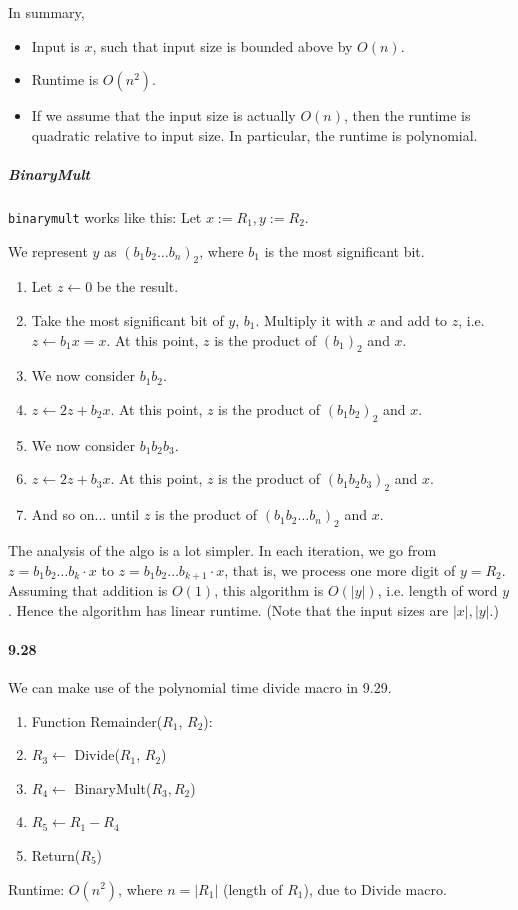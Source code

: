 \documentclass{article}
\begin{document}
In summary,
\begin{itemize}
	\item Input is $x$, such that input size is bounded above by $O(n)$.
	\item Runtime is $O(n^2)$.
	\item If we assume that the input size is actually $O(n)$, then the runtime is quadratic relative to input size. In particular, the runtime is polynomial.
\end{itemize}

\subparagraph{BinaryMult} \texttt{binarymult} works like this: Let $x:=R_1, y:=R_2$.

We represent $y$ as $(b_1b_2\dots b_n)_2$, where $b_1$ is the most significant bit.

\begin{enumerate}
	\item Let $z\gets 0$ be the result.
	\item Take the most significant bit of $y$, $b_1$. Multiply it with $x$ and add to $z$, i.e. $z\gets b_1x = x$. At this point, $z$ is the product of $(b_1)_2$ and $x$.
	\item We now consider $b_1b_2$.
	\item $z\gets 2z+b_2x$. At this point, $z$ is the product of $(b_1b_2)_2$ and $x$.
	\item We now consider $b_1b_2b_3$.
	\item $z\gets 2z+b_3x$. At this point, $z$ is the product of $(b_1b_2b_3)_2$ and $x$.
	\item And so on... until $z$ is the product of $(b_1b_2\dots b_n)_2$ and $x$.
\end{enumerate}
The analysis of the algo is a lot simpler. In each iteration, we go from $z=b_1b_2\dots b_k\cdot x$ to $z=b_1b_2\dots b_{k+1}\cdot x$, that is, we process one more digit of $y=R_2$. Assuming that addition is $O(1)$, this algorithm is $O(|y|)$, i.e. length of word $y$. Hence the algorithm has linear runtime. (Note that the input sizes are $|x|,|y|$.)

\paragraph{9.28}
We can make use of the polynomial time divide macro in 9.29.
\begin{enumerate}
	\item Function Remainder($R_1$, $R_2$):
	\item $R_3\gets$ Divide($R_1$, $R_2$)
	\item $R_4\gets$ BinaryMult($R_3, R_2$)
	\item $R_5\gets R_1-R_4$
	\item Return($R_5$)
\end{enumerate}
Runtime: $O(n^2)$, where $n=|R_1|$ (length of $R_1$), due to Divide macro.
\end{document}
